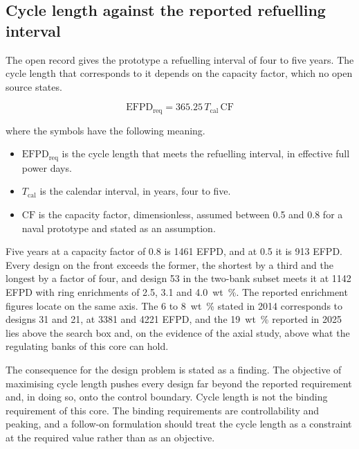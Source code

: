 

\subsection{Cycle length against the reported refuelling interval}
\label{sec:res-c8-mission}

The open record gives the prototype a refuelling interval of four to
five years. The cycle length that corresponds to it depends on the
capacity factor, which no open source states.

\begin{equation}
\mathrm{EFPD}_\mathrm{req} = 365.25\, T_\mathrm{cal}\, \mathrm{CF}
\label{eq:mission-efpd}
\end{equation}

\noindent where the symbols have the following meaning.

\begin{itemize}
  \item $\mathrm{EFPD}_\mathrm{req}$ is the cycle length that meets the
        refuelling interval, in effective full power days.

  \item $T_\mathrm{cal}$ is the calendar interval, in years, four to
        five.

  \item $\mathrm{CF}$ is the capacity factor, dimensionless, assumed
        between 0.5 and 0.8 for a naval prototype and stated as an
        assumption.
\end{itemize}

Five years at a capacity factor of 0.8 is 1461 EFPD, and at 0.5 it is
913 EFPD. Every design on the front exceeds the former, the shortest by
a third and the longest by a factor of four, and design 53 in the
two-bank subset meets it at 1142 EFPD with ring enrichments of 2.5,
3.1 and \SI{4.0}{wt\%}. The reported enrichment figures locate on the
same axis. The 6 to \SI{8}{wt\%} stated in 2014 corresponds to designs
31 and 21, at 3381 and 4221 EFPD, and the \SI{19}{wt\%} reported in
2025 lies above the search box and, on the evidence of the axial study,
above what the regulating banks of this core can hold.

The consequence for the design problem is stated as a finding. The
objective of maximising cycle length pushes every design far beyond
the reported requirement and, in doing so, onto the control boundary.
Cycle length is not the binding requirement of this core. The binding
requirements are controllability and peaking, and a follow-on
formulation should treat the cycle length as a constraint at the
required value rather than as an objective.

